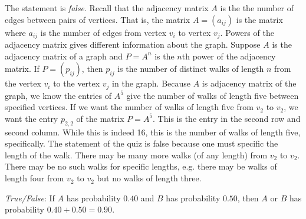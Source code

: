\documentclass[11pt,letterpaper]{article}
\begin{document}
\sol The statement is \textit{false}. Recall that the adjacency matrix $A$ is the the number of edges between pairs of vertices. That is, the matrix $A= (a_{ij})$ is the matrix where $a_{ij}$ is the number of edges from vertex $v_i$ to vertex $v_j$. Powers of the adjacency matrix gives different information about the graph. Suppose $A$ is the adjacency matrix of a graph and $P= A^n$ is the $n$th power of the adjacency matrix. If $P= (p_{ij})$, then $p_{ij}$ is the number of distinct walks of length $n$ from the vertex $v_i$ to the vertex $v_j$ in the graph. Because $A$ is adjacency matrix of the graph, we know the entries of $A^5$ give the number of walks of length five between specified vertices. If we want the number of walks of length five from $v_2$ to $v_2$, we want the entry $p_{2,2}$ of the matrix $P= A^5$. This is the entry in the second row and second column. While this is indeed 16, this is the number of walks of length five, specifically. The statement of the quiz is false because one must specific the length of the walk. There may be many more walks (of any length) from $v_2$ to $v_2$. There may be no such walks for specific lengths, e.g. there may be walks of length four from $v_2$ to $v_2$ but no walks of length three. \pvspace{1.3cm}



\quizsol \textit{True/False}: If $A$ has probability $0.40$ and $B$ has probability $0.50$, then $A$ or $B$ has probability $0.40 + 0.50= 0.90$. \pspace
\end{document}
